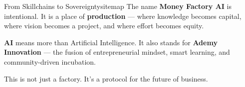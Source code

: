 \documentclass[12pt]{article}
\begin{document}
\begin{mfai-box-star}{From Skillchains to Sovereignty}{sitemap}
The name \textbf{Money Factory AI} is intentional. It is a place of \textbf{production} — where knowledge becomes capital, where vision becomes a project, and where effort becomes equity.

\textbf{AI} means more than Artificial Intelligence. It also stands for \textbf{Ademy Innovation} — the fusion of entrepreneurial mindset, smart learning, and community-driven incubation.

This is not just a factory. It’s a protocol for the future of business.
\end{mfai-box-star}
\end{document}
